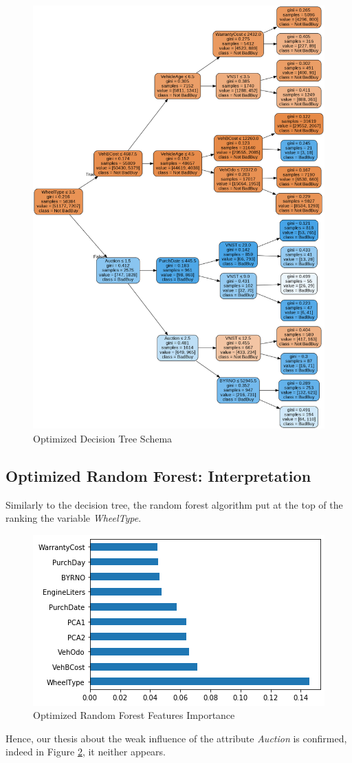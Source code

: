\documentclass{article}
\begin{document}
	
	\begin{figure}[]
		\centering
		\includegraphics[height=.95\textheight]{dectree.png}
		\caption{Optimized Decision Tree Schema}
		\label{fig:optdectree}
	\end{figure}
	
	\subsection{Optimized Random Forest: Interpretation}
	Similarly to the decision tree, the random forest algorithm put at the top of the ranking the variable \emph{WheelType}.
	\begin{figure}
		\centering
		\includegraphics[width=.4\textwidth]{rfw.png}
		\caption{Optimized Random Forest Features Importance}
		\label{fig:optrfw}
	\end{figure}
	Hence, our thesis about the weak influence of the attribute \emph{Auction} is confirmed, indeed in Figure \ref{fig:optrfw}, it neither appears.
	
\end{document}
